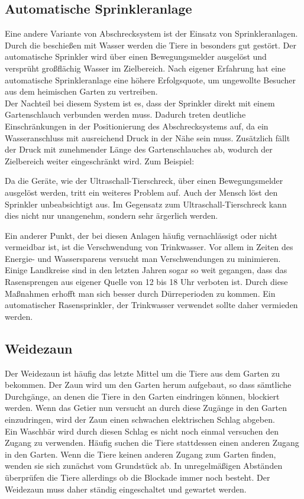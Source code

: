 \subsection{Automatische Sprinkleranlage}

Eine andere Variante von Abschrecksystem ist der Einsatz von Sprinkleranlagen. Durch die beschießen mit Wasser werden die Tiere in besonders gut gestört. Der automatische Sprinkler wird über einen Bewegungsmelder ausgelöst und versprüht großflächig Wasser im Zielbereich. Nach eigener Erfahrung hat eine automatische Sprinkleranlage eine höhere Erfolgsquote, um ungewollte Besucher aus dem heimischen Garten zu vertreiben. \cite{anti_wasch}\\
Der Nachteil bei diesem System ist es, dass der Sprinkler direkt mit einem Gartenschlauch verbunden werden muss. Dadurch treten deutliche Einschränkungen in der Positionierung des Abschrecksystems auf, da ein Wasseranschluss mit ausreichend Druck in der Nähe sein muss. Zusätzlich fällt der Druck mit zunehmender Länge des Gartenschlauches ab, wodurch der Zielbereich weiter eingeschränkt wird. Zum Beispiel:


Da die Geräte, wie der Ultraschall-Tierschreck, über einen Bewegungsmelder ausgelöst werden, tritt ein weiteres Problem auf. Auch der Mensch löst den Sprinkler unbeabsichtigt aus. Im Gegensatz zum Ultraschall-Tierschreck kann dies nicht nur unangenehm, sondern sehr ärgerlich werden.

Ein anderer Punkt, der bei diesen Anlagen häufig vernachlässigt oder nicht vermeidbar ist, ist die Verschwendung von Trinkwasser. Vor allem in Zeiten des Energie- und Wassersparens versucht man Verschwendungen zu minimieren. Einige Landkreise sind in den letzten Jahren sogar so weit gegangen, dass das Rasensprengen aus eigener Quelle von 12 bis 18 Uhr verboten ist. Durch diese Maßnahmen erhofft man sich besser durch Dürreperioden zu kommen. Ein automatischer Rasensprinkler, der Trinkwasser verwendet sollte daher vermieden werden. \cite{wasser_verbot}

\subsection{Weidezaun}

Der Weidezaun ist häufig das letzte Mittel um die Tiere aus dem Garten zu bekommen. Der Zaun wird um den Garten herum aufgebaut, so dass sämtliche Durchgänge, an denen die Tiere in den Garten eindringen können, blockiert werden. Wenn das Getier nun versucht an durch diese Zugänge in den Garten einzudringen, wird der Zaun einen schwachen elektrischen Schlag abgeben.
\\
Ein Waschbär wird durch diesen Schlag es nicht noch einmal versuchen den Zugang zu verwenden. Häufig suchen die Tiere stattdessen einen anderen Zugang in den Garten. Wenn die Tiere keinen anderen Zugang zum Garten finden, wenden sie sich zunächst vom Grundstück ab. In unregelmäßigen Abständen überprüfen die Tiere allerdings ob die Blockade immer noch besteht. Der Weidezaun muss daher ständig eingeschaltet und gewartet werden. \cite{anti_wasch}

